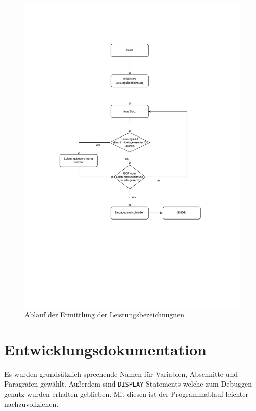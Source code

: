         

\begin{figure}[!h]
    \centering
    \includegraphics[width=\textwidth,height=\textheight,keepaspectratio]{images/Erhalte_Leistungsbezeichnung-PAP.pdf}
    \caption{
        Ablauf der Ermittlung der Leistungsbezeichnugnen
    }
    \label{fig:diagramm3}
\end{figure}



\section{Entwicklungsdokumentation}\label{sec:entwicklerdokumentation}
Es wurden grundsätzlich sprechende Namen für Variablen, Abschnitte und Paragrafen gewählt. Außerdem sind \texttt{DISPLAY} Statements welche zum Debuggen genutz wurden erhalten geblieben. Mit diesen ist der Programmablauf leichter nachzuvollziehen.


